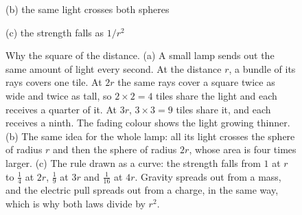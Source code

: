 \begin{figure}[tbp]
\begin{minipage}[b]{0.36\textwidth}
\smallskip
{\small (b) the same light crosses both spheres\par}
\end{minipage}\hfill
\begin{minipage}[b]{0.6\textwidth}
\centering
{}

\smallskip
{\small (c) the strength falls as $1/r^2$\par}
\end{minipage}

\caption[Why the square of the distance]{Why the square of the distance. (a) A small lamp sends out the same amount of light every second. At the distance $r$, a bundle of its rays covers one tile. At $2r$ the same rays cover a square twice as wide and twice as tall, so $2 \times 2 = 4$ tiles share the light and each receives a quarter of it. At $3r$, $3 \times 3 = 9$ tiles share it, and each receives a ninth. The fading colour shows the light growing thinner. (b) The same idea for the whole lamp: all its light crosses the sphere of radius $r$ and then the sphere of radius $2r$, whose area is four times larger. (c) The rule drawn as a curve: the strength falls from $1$ at $r$ to $\frac{1}{4}$ at $2r$, $\frac{1}{9}$ at $3r$ and $\frac{1}{16}$ at $4r$. Gravity spreads out from a mass, and the electric pull spreads out from a charge, in the same way, which is why both laws divide by $r^2$.}
\label{fig:inverse-square}
\end{figure}



